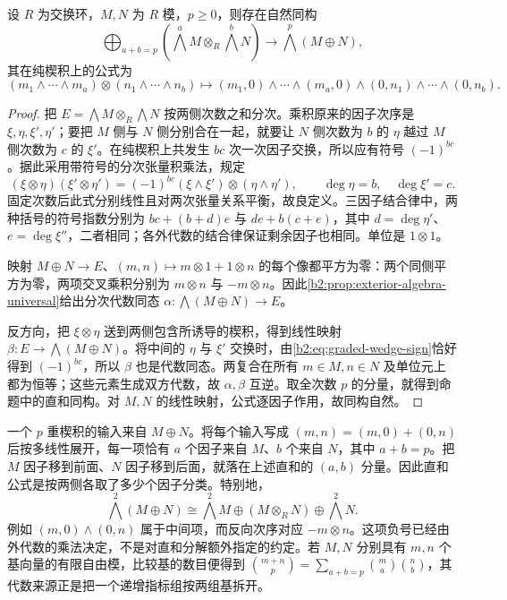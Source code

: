 \begin{proposition}[直和的外幂]\label{b2:prop:exterior-direct-sum}
	设 \(R\) 为交换环，\(M,N\) 为 \(R\) 模，\(p\ge0\)，则存在自然同构
	\[
		\bigoplus_{a+b=p}\left(\bigwedge^aM\otimes_R\bigwedge^bN\right) \longrightarrow\bigwedge^p(M\oplus N),
	\]
	其在纯楔积上的公式为
	\[
		(m_1\wedge\cdots\wedge m_a)\otimes(n_1\wedge\cdots\wedge n_b) \longmapsto (m_1,0)\wedge\cdots\wedge(m_a,0)\wedge(0,n_1)\wedge\cdots\wedge(0,n_b).
	\]
\end{proposition}
\begin{proof}
	把 \(E=\bigwedge M\otimes_R\bigwedge N\) 按两侧次数之和分次。乘积原来的因子次序是 \(\xi,\eta,\xi',\eta'\)；要把 \(M\) 侧与 \(N\) 侧分别合在一起，就要让 \(N\) 侧次数为 \(b\) 的 \(\eta\) 越过 \(M\) 侧次数为 \(c\) 的 \(\xi'\)。在纯楔积上共发生 \(bc\) 次一次因子交换，所以应有符号 \((-1)^{bc}\)。据此采用带符号的分次张量积乘法，规定
	\[
		(\xi\otimes\eta)(\xi'\otimes\eta') =(-1)^{bc}(\xi\wedge\xi')\otimes(\eta\wedge\eta'), \qquad \deg\eta=b,\quad\deg\xi'=c.
	\]
	固定次数后此式分别线性且对两次张量关系平衡，故良定义。三因子结合律中，两种括号的符号指数分别为 \(bc+(b+d)e\) 与 \(de+b(c+e)\)，其中 \(d=\deg\eta'\)、\(e=\deg\xi''\)，二者相同；各外代数的结合律保证剩余因子也相同。单位是 \(1\otimes1\)。

	映射 \(M\oplus N\to E\)、\((m,n)\mapsto m\otimes1+1\otimes n\) 的每个像都平方为零：两个同侧平方为零，两项交叉乘积分别为 \(m\otimes n\) 与 \(-m\otimes n\)。因此\cref{b2:prop:exterior-algebra-universal}给出分次代数同态 \(\alpha:\bigwedge(M\oplus N)\to E\)。

	反方向，把 \(\xi\otimes\eta\) 送到两侧包含所诱导的楔积，得到线性映射 \(\beta:E\to\bigwedge(M\oplus N)\)。将中间的 \(\eta\) 与 \(\xi'\) 交换时，由\eqref{b2:eq:graded-wedge-sign}恰好得到 \((-1)^{bc}\)，所以 \(\beta\) 也是代数同态。两复合在所有 \(m\in M,n\in N\) 及单位元上都为恒等；这些元素生成双方代数，故 \(\alpha,\beta\) 互逆。取全次数 \(p\) 的分量，就得到命题中的直和同构。对 \(M,N\) 的线性映射，公式逐因子作用，故同构自然。
\end{proof}

一个 \(p\) 重楔积的输入来自 \(M\oplus N\)。将每个输入写成 \((m,n)=(m,0)+(0,n)\) 后按多线性展开，每一项恰有 \(a\) 个因子来自 \(M\)、\(b\) 个来自 \(N\)，其中 \(a+b=p\)。把 \(M\) 因子移到前面、\(N\) 因子移到后面，就落在上述直和的 \((a,b)\) 分量。因此直和公式是按两侧各取了多少个因子分类。特别地，
\[
	\bigwedge^2(M\oplus N) \cong\bigwedge^2M\oplus(M\otimes_RN)\oplus\bigwedge^2N.
\]
例如 \((m,0)\wedge(0,n)\) 属于中间项，而反向次序对应 \(-m\otimes n\)。这项负号已经由外代数的乘法决定，不是对直和分解额外指定的约定。若 \(M,N\) 分别具有 \(m,n\) 个基向量的有限自由模，比较基的数目便得到 \(\binom{m+n}{p}=\sum_{a+b=p}\binom ma\binom nb\)，其代数来源正是把一个递增指标组按两组基拆开。

